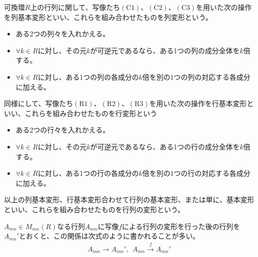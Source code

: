 \documentclass[dvipdfmx]{jsarticle}
\begin{document}
\begin{dfn}
可換環$R$上の行列に関して、写像たち$(\mathrm{C1})$、$(\mathrm{C2})$、$(\mathrm{C3})$を用いた次の操作を列基本変形といい、これらを組み合わせたものを列変形という。
\begin{itemize}
\item
  ある2つの列々を入れかえる。
\item
  $\forall k \in R$に対し、その元$k$が可逆元であるなら、ある1つの列の成分全体を$k$倍する。
\item
  $\forall k \in R$に対し、ある1つの列の各成分の$k$倍を別の1つの列の対応する各成分に加える。
\end{itemize}
同様にして、写像たち$(\mathrm{R1})$、$(\mathrm{R2})$、$(\mathrm{R3})$を用いた次の操作を行基本変形といい、これらを組み合わせたものを行変形という
\begin{itemize}
\item
  ある2つの行々を入れかえる。
\item
  $\forall k \in R$に対し、その元$k$が可逆元であるなら、ある1つの行の成分全体を$k$倍する。
\item
  $\forall k \in R$に対し、ある1つの行の各成分の$k$倍を別の1つの行の対応する各成分に加える。
\end{itemize}
以上の列基本変形、行基本変形合わせて行列の基本変形、または単に、基本変形といい、これらを組み合わせたものを行列の変形という。\par
$A_{mn} \in M_{mn}(R)$なる行列$A_{mn}$に写像$f$による行列の変形を行った後の行列を$A_{mn}'$とおくと、この関係は次式のように書かれることが多い。
\begin{align*}
A_{mn} \rightarrow A_{mn}',\ \ A_{mn}\overset{f}{\rightarrow}A_{mn}'
\end{align*}
\end{dfn}
\end{document}
